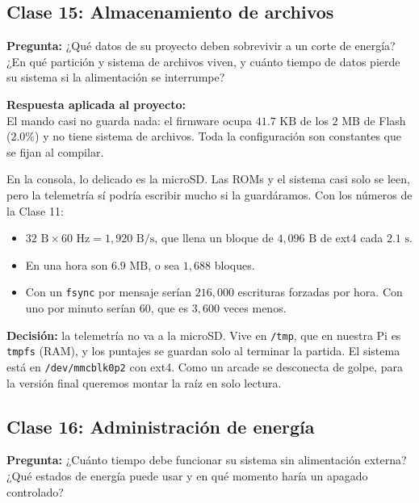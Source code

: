 
\subsection{Clase 15: Almacenamiento de archivos}

\textbf{Pregunta:} ¿Qué datos de su proyecto deben sobrevivir a un corte de energía? ¿En qué partición y sistema de archivos viven, y cuánto tiempo de datos pierde su sistema si la alimentación se interrumpe?

\textbf{Respuesta aplicada al proyecto:} \\
El mando casi no guarda nada: el firmware ocupa $41.7\text{ KB}$ de los $2\text{ MB}$ de Flash ($2.0\%$) y no tiene sistema de archivos. Toda la configuración son constantes que se fijan al compilar.

En la consola, lo delicado es la microSD. Las ROMs y el sistema casi solo se leen, pero la telemetría sí podría escribir mucho si la guardáramos. Con los números de la Clase 11:
\begin{itemize}
	\item $32\text{ B} \times 60\text{ Hz} = 1{,}920\text{ B/s}$, que llena un bloque de $4{,}096\text{ B}$ de ext4 cada $2.1\text{ s}$.
	\item En una hora son $6.9\text{ MB}$, o sea $1{,}688$ bloques.
	\item Con un \texttt{fsync} por mensaje serían $216{,}000$ escrituras forzadas por hora. Con uno por minuto serían $60$, que es $3{,}600$ veces menos.
\end{itemize}

\textbf{Decisión:} la telemetría no va a la microSD. Vive en \texttt{/tmp}, que en nuestra Pi es \texttt{tmpfs} (RAM), y los puntajes se guardan solo al terminar la partida. El sistema está en \texttt{/dev/mmcblk0p2} con ext4. Como un arcade se desconecta de golpe, para la versión final queremos montar la raíz en solo lectura.

\subsection{Clase 16: Administración de energía}

\textbf{Pregunta:} ¿Cuánto tiempo debe funcionar su sistema sin alimentación externa? ¿Qué estados de energía puede usar y en qué momento haría un apagado controlado?

